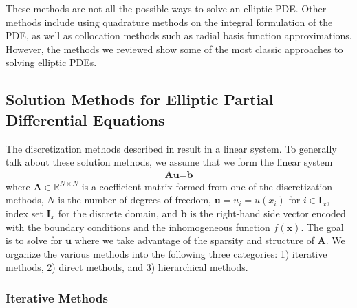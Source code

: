 These methods are not all the possible ways to solve an elliptic PDE. Other methods include using quadrature methods on the integral formulation of the PDE, as well as collocation methods such as radial basis function approximations. However, the methods we reviewed show some of the most classic approaches to solving elliptic PDEs.

\subsection{Solution Methods for Elliptic Partial Differential Equations}
\label{sec:solution-methods-for-elliptic-pdes}

The discretization methods described in  result in a linear system. To generally talk about these solution methods, we assume that we form the linear system
\begin{align}
    \textbf{A} \textbf{u} = \textbf{b}
    \label{eq:ls}
\end{align}
where $\textbf{A} \in \mathbb{R}^{N \times N}$ is a coefficient matrix formed from one of the discretization methods, $N$ is the number of degrees of freedom, $\textbf{u} = u_i = u(x_i)$ for $i \in \textbf{I}_x$, index set $\textbf{I}_x$ for the discrete domain, and $\textbf{b}$ is the right-hand side vector encoded with the boundary conditions and the inhomogeneous function $f(\textbf{x})$. The goal is to solve for $\textbf{u}$ where we take advantage of the sparsity and structure of $\textbf{A}$. We organize the various methods into the following three categories: 1) iterative methods, 2) direct methods, and 3) hierarchical methods.

\subsubsection{Iterative Methods}
\label{sub:iterative-methods}

